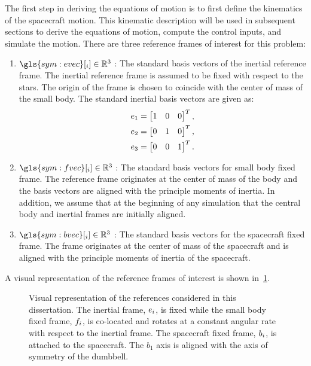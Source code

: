 The first step in deriving the equations of motion is to first define the \gls{kinematics} of the spacecraft motion.
This kinematic description will be used in subsequent sections to derive the equations of motion, compute the control inputs, and simulate the motion.
There are three reference frames of interest for this problem:
\begin{enumerate}
    \item \( \gls{sym:evec}[_i] \in \R^3 \) : The standard basis vectors of the inertial reference frame.
        The inertial reference frame is assumed to be fixed with respect to the stars. 
        The origin of the frame is chosen to coincide with the center of mass of the small body.
        The standard inertial basis vectors are given as:
        \begin{align*}
            e_{1} &= \begin{bmatrix} 1 & 0 & 0 \end{bmatrix}^T, \\
            e_{2} &= \begin{bmatrix} 0 & 1 & 0 \end{bmatrix}^T, \\
            e_{3} &= \begin{bmatrix} 0 & 0 & 1 \end{bmatrix}^T.
        \end{align*}
    \item \( \gls{sym:fvec}[_i] \in \R^3 \) : The standard basis vectors for small body fixed frame.
        The reference frame originates at the center of mass of the body and the basis vectors are aligned with the principle moments of inertia. 
        In addition, we assume that at the beginning of any simulation that the central body and inertial frames are initially aligned.
    \item \( \gls{sym:bvec}[_i] \in \R^3 \) : The standard basis vectors for the spacecraft fixed frame.
        The frame originates at the center of mass of the spacecraft and is aligned with the principle moments of inertia of the spacecraft.
\end{enumerate}
A visual representation of the reference frames of interest is shown in~\cref{fig:reference_frames}.
\begin{figure}
    \centering
    
    \caption{Visual representation of the references considered in this dissertation.
    The inertial frame, \( e_i \), is fixed while the small body fixed frame, \( f_i \), is co-located and rotates at a constant angular rate with respect to the inertial frame.
The spacecraft fixed frame, \( b_i \), is attached to the spacecraft.
The \( b_1 \) axis is aligned with the axis of symmetry of the dumbbell.\label{fig:reference_frames}}
\end{figure}

